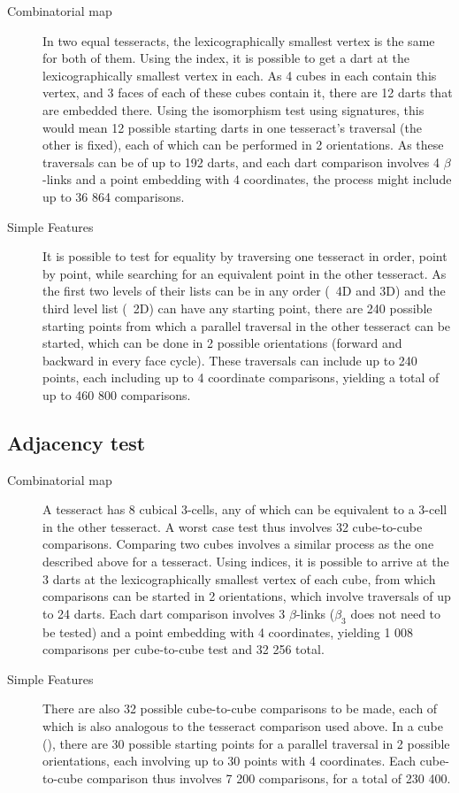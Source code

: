 \begin{description}
\item[Combinatorial map] In two equal tesseracts, the lexicographically smallest vertex is the same for both of them.
Using the index, it is possible to get a dart at the lexicographically smallest vertex in each.
As 4 cubes in each contain this vertex, and 3 faces of each of these cubes contain it, there are 12 darts that are embedded there.
Using the isomorphism test using signatures, this would mean 12 possible starting darts in one tesseract's traversal (the other is fixed), each of which can be performed in 2 orientations.
As these traversals can be of up to 192 darts, and each dart comparison involves 4 $\beta$-links and a point embedding with 4 coordinates, the process might include up to 36 864 comparisons.

\item[Simple Features] It is possible to test for equality by traversing one tesseract in order, point by point, while searching for an equivalent point in the other tesseract.
As the first two levels of their lists can be in any order (\ie\ 4D and 3D) and the third level list (\ie\ 2D) can have any starting point, there are 240 possible starting points from which a parallel traversal in the other tesseract can be started, which can be done in 2 possible orientations (forward and backward in every face cycle).
These traversals can include up to 240 points, each including up to 4 coordinate comparisons, yielding a total of up to 460 800 comparisons.
\end{description}

\subsection*{Adjacency test}

\begin{description}
\item[Combinatorial map] A tesseract has 8 cubical 3-cells, any of which can be equivalent to a 3-cell in the other tesseract.
A worst case test thus involves 32 cube-to-cube comparisons.
Comparing two cubes involves a similar process as the one described above for a tesseract.
Using indices, it is possible to arrive at the 3 darts at the lexicographically smallest vertex of each cube, from which comparisons can be started in 2 orientations, which involve traversals of up to 24 darts.
Each dart comparison involves 3 $\beta$-links ($\beta_3$ does not need to be tested) and a point embedding with 4 coordinates, yielding 1 008 comparisons per cube-to-cube test and 32 256 total.

\item[Simple Features] There are also 32 possible cube-to-cube comparisons to be made, each of which is also analogous to the tesseract comparison used above.
In a cube (), there are 30 possible starting points for a parallel traversal in 2 possible orientations, each involving up to 30 points with 4 coordinates.
Each cube-to-cube comparison thus involves 7 200 comparisons, for a total of 230 400.
\end{description}

